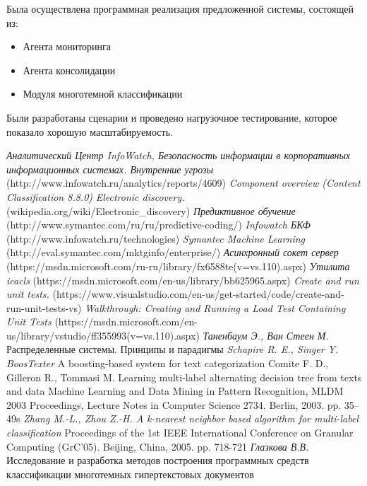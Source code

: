 \documentclass[russian, utf8, emptystyle]{eskdtext}
\begin{document}
Была осуществлена программная реализация предложенной системы, состоящей из:
\begin{itemize}
	\item Агента мониторинга
	\item Агента консолидации
	\item Модуля многотемной классификации
\end{itemize}

Были разработаны сценарии и проведено нагрузочное тестирование, которое показало хорошую масштабируемость.

\begin{thebibliography}{50}
	\textit {Аналитический Центр InfoWatch, Безопасность информации в корпоративных информационных системах. Внутренние угрозы}
	{(http://www.infowatch.ru/analytics/reports/4609)}
	\textit {Component overview (Content Classification 8.8.0)}
	\textit{Electronic discovery.}
	{(wikipedia.org/wiki/Electronic\_discovery)}
	\textit {Предиктивное обучение}
	{(http://www.symantec.com/ru/ru/predictive-coding/)}
	\textit {Infowatch БКФ }
	{(http://www.infowatch.ru/technologies)}
	\textit {Symantec Machine Learning}
	{(http://eval.symantec.com/mktginfo/enterprise/)}
	\textit{Асинхронный сокет сервер}
	{(https://msdn.microsoft.com/ru-ru/library/fx6588te(v=vs.110).aspx)}
	\textit{Утилита icacls}
	{(https://msdn.microsoft.com/en-us/library/bb625965.aspx)}
	\textit{Create and run unit tests.}
	{(https://www.visualstudio.com/en-us/get-started/code/create-and-run-unit-tests-vs)}
	\textit{Walkthrough: Creating and Running a Load Test Containing Unit Tests}
	{(https://msdn.microsoft.com/en-us/library/vstudio/ff355993(v=vs.110).aspx)}
	\textit{Таненбаум Э., Ван Стеен М.}
	{Распределенные системы. Принципы и парадигмы}
	\textit{Schapire R. E., Singer Y. BoosTexter}
	{A boosting-based system for text categorization}
	{Comite F. D., Gilleron R., Tommasi M. Learning multi-label alternating decision tree from texts and data}
	{Machine Learning and Data Mining in Pattern Recognition, MLDM 2003 Proceedings, Lecture Notes in Computer Science 2734. Berlin, 2003. pp. 35–49s}
	\textit{Zhang M.-L., Zhou Z.-H. A k-nearest neighbor based algorithm for multi-label classification }
	{Proceedings of the 1st IEEE International Conference on Granular Computing (GrC'05). Beijing, China, 2005. pp. 718-721}
	\textit{Глазкова В.В.}
	{Исследование и разработка методов построения программных средств классификации многотемных гипертекстовых документов}
\end{thebibliography}
\end{document}
